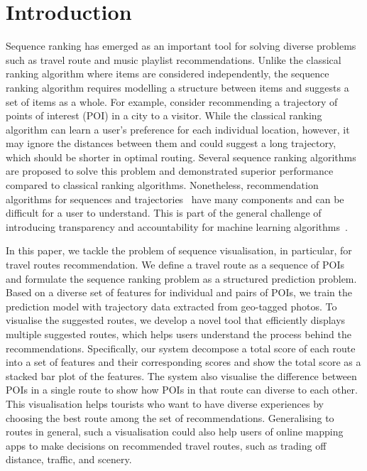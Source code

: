 
\section{Introduction}
Sequence ranking has emerged as an important tool for solving diverse problems such as travel route and music playlist recommendations. 
Unlike the classical ranking algorithm where items are considered independently, the sequence ranking algorithm requires modelling a structure between items and suggests a set of items as a whole. 
For example, consider recommending a trajectory of points of interest (POI) in a city to a visitor. 
While the classical ranking algorithm can learn a user's preference for each individual location, however, it may ignore the distances between them and could suggest a long trajectory, which should be shorter in optimal routing. 
Several sequence ranking algorithms are proposed to solve this problem and demonstrated superior performance compared to classical ranking algorithms. 
Nonetheless, recommendation algorithms for sequences and trajectories~\cite{chen2016learning,chen2017SR} have many components and can be difficult for a user to understand. This is part of the general challenge of introducing transparency and accountability for machine learning algorithms~\cite{fatml}. 

In this paper, we tackle the problem of sequence visualisation, in particular, for travel routes recommendation. 
We define a travel route as a sequence of POIs and formulate the sequence ranking problem as a structured prediction problem. 
Based on a diverse set of features for individual and pairs of POIs, we train the prediction model with trajectory data extracted from geo-tagged photos. 
To visualise the suggested routes, we develop a novel tool that efficiently displays multiple suggested routes, which helps users understand the process behind the recommendations.
Specifically, our system decompose a total score of each route into a set of features and their corresponding scores and show the total score as a stacked bar plot of the features.
The system also visualise the difference between POIs in a single route to show how POIs in that route can diverse to each other. 
This visualisation helps tourists who want to have diverse experiences by choosing the best route among the set of recommendations. Generalising to routes in general, such a visualisation could also help users of online mapping apps to make decisions on recommended travel routes, such as trading off distance, traffic, and scenery. 